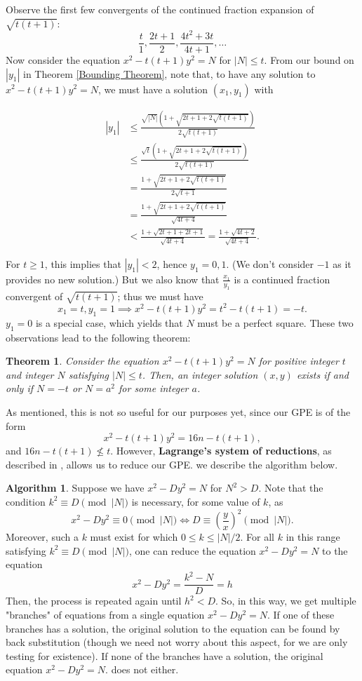 \documentclass[12pt]{amsart}
\theoremstyle{theorem}
\newtheorem{theorem}{Theorem}
\theoremstyle{definition}
\newtheorem{algorithm}{Algorithm}
\theoremstyle{plain}
\begin{document}
Observe the first few convergents of the continued fraction expansion of $\sqrt{t(t+1)}$: $$\frac{t}{1}, \frac{2t+1}{2}, \frac{4t^2 + 3t}{4t+1}, \dots$$ Now consider the equation $x^2 - t(t+1)y^2 = N$ for $|N| \le t$. From our bound on $|y_1|$ in Theorem \ref{Bounding Theorem}, note that, to have any solution to $x^2 - t(t+1)y^2 = N$, we must have a solution $(x_1, y_1)$ with

\begin{align*} |y_1| &\le \frac{\sqrt{|N|}(1 + \sqrt{2t+1 + 2\sqrt{t(t+1)}})}{2 \sqrt{t(t+1)}} \\
&\le \frac{\sqrt{t}\left(1 + \sqrt{2t+1 + 2\sqrt{t(t+1)}}\right)}{2 \sqrt{t(t+1)}} \\
&= \frac{1 + \sqrt{2t+1 + 2\sqrt{t(t+1)}}}{2 \sqrt{t+1}} \\
&= \frac{1 + \sqrt{2t+1 + 2\sqrt{t(t+1)}}}{\sqrt{4t + 4}} \\
&< \frac{1 + \sqrt{2t+1 + 2t + 1}}{\sqrt{4t+4}} = \frac{1 + \sqrt{4t+2}}{\sqrt{4t+4}}. 
\end{align*}

For $t \ge 1$, this implies that $|y_1| < 2$, hence $y_1 = 0, 1$. (We don't consider $-1$ as it provides no new solution.) But we also know that $\frac{x_1}{y_1}$ is a continued fraction convergent of $\sqrt{t(t+1)}$; thus we must have $$x_1 = t, y_1 = 1 \implies x^2 - t(t+1)y^2 = t^2 - t(t+1) = -t.$$ $y_1 =0$ is a special case, which yields that $N$ must be a perfect square. These two observations lead to the following theorem: 

\begin{theorem}\label{existence less than sqrt}
    Consider the equation $x^2 - t(t+1)y^2 = N$ for positive integer $t$ and integer $N$ satisfying $|N| \le t$. Then, an integer solution $(x,y)$ exists if and only if $N = -t$ or $N = a^2$ for some integer $a$.
\end{theorem}

As mentioned, this is not so useful for our purposes yet, since our GPE is of the form $$x^2 - t(t+1)y^2 = 16n - t(t+1),$$ and $16n - t(t+1) \not\le t.$ However, \textbf{Lagrange's system of reductions}, as described in \cite{b9}, allows us to reduce our GPE. we describe the algorithm below.

\begin{algorithm}
    Suppose we have $x^2 - Dy^2 = N$ for $N^2 > D$. Note that the condition $k^2 \equiv D \pmod{|N|}$ is necessary, for some value of $k$, as $$x^2 - Dy^2 \equiv 0 \pmod{|N|} \iff D \equiv \left(\frac{y}{x} \right)^2 \pmod{|N|}.$$ Moreover, such a $k$ must exist for which $0 \le k \le |N|/2$. For all $k$ in this range satisfying $k^2 \equiv D \pmod{|N|}$, one can reduce the equation $x^2 - Dy^2 = N$ to the equation $$x^2 - Dy^2 = \frac{k^2 - N}{D} = h$$ Then, the process is repeated again until $h^2 < D$. So, in this way, we get multiple "branches" of equations from a single equation $x^2 - Dy^2 = N$. If one of these branches has a solution, the original solution to the equation can be found by back substitution (though we need not worry about this aspect, for we are only testing for existence). If none of the branches have a solution, the original equation $x^2 - Dy^2 = N$. does not either.
\end{algorithm}
\end{document}
